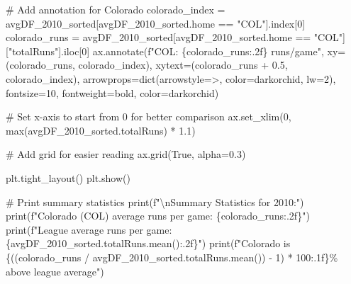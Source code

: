 \documentclass[
  letterpaper,
  DIV=11,
  numbers=noendperiod]{scrartcl}
\newenvironment{Shaded}{\begin{snugshade}}{\end{snugshade}}
\newcommand{\BuiltInTok}[1]{\textcolor[rgb]{0.00,0.23,0.31}{#1}}
\newcommand{\CharTok}[1]{\textcolor[rgb]{0.13,0.47,0.30}{#1}}
\newcommand{\CommentTok}[1]{\textcolor[rgb]{0.37,0.37,0.37}{#1}}
\newcommand{\DecValTok}[1]{\textcolor[rgb]{0.68,0.00,0.00}{#1}}
\newcommand{\FloatTok}[1]{\textcolor[rgb]{0.68,0.00,0.00}{#1}}
\newcommand{\NormalTok}[1]{\textcolor[rgb]{0.00,0.23,0.31}{#1}}
\newcommand{\OperatorTok}[1]{\textcolor[rgb]{0.37,0.37,0.37}{#1}}
\newcommand{\SpecialCharTok}[1]{\textcolor[rgb]{0.37,0.37,0.37}{#1}}
\newcommand{\SpecialStringTok}[1]{\textcolor[rgb]{0.13,0.47,0.30}{#1}}
\newcommand{\StringTok}[1]{\textcolor[rgb]{0.13,0.47,0.30}{#1}}
\newcommand{\VariableTok}[1]{\textcolor[rgb]{0.07,0.07,0.07}{#1}}
\begin{document}
\begin{Shaded}
\begin{Highlighting}[]
\CommentTok{\# Add annotation for Colorado}
\NormalTok{colorado\_index }\OperatorTok{=}\NormalTok{ avgDF\_2010\_sorted[avgDF\_2010\_sorted.home }\OperatorTok{==} \StringTok{"COL"}\NormalTok{].index[}\DecValTok{0}\NormalTok{]}
\NormalTok{colorado\_runs }\OperatorTok{=}\NormalTok{ avgDF\_2010\_sorted[avgDF\_2010\_sorted.home }\OperatorTok{==} \StringTok{"COL"}\NormalTok{][}\StringTok{"totalRuns"}\NormalTok{].iloc[}\DecValTok{0}\NormalTok{]}
\NormalTok{ax.annotate(}\SpecialStringTok{f"COL: }\SpecialCharTok{\{}\NormalTok{colorado\_runs}\SpecialCharTok{:.2f\}}\SpecialStringTok{ runs/game"}\NormalTok{, }
\NormalTok{            xy}\OperatorTok{=}\NormalTok{(colorado\_runs, colorado\_index), }
\NormalTok{            xytext}\OperatorTok{=}\NormalTok{(colorado\_runs }\OperatorTok{+} \FloatTok{0.5}\NormalTok{, colorado\_index),}
\NormalTok{            arrowprops}\OperatorTok{=}\BuiltInTok{dict}\NormalTok{(arrowstyle}\OperatorTok{=}\StringTok{\textquotesingle{}{-}\textgreater{}\textquotesingle{}}\NormalTok{, color}\OperatorTok{=}\StringTok{\textquotesingle{}darkorchid\textquotesingle{}}\NormalTok{, lw}\OperatorTok{=}\DecValTok{2}\NormalTok{),}
\NormalTok{            fontsize}\OperatorTok{=}\DecValTok{10}\NormalTok{, fontweight}\OperatorTok{=}\StringTok{\textquotesingle{}bold\textquotesingle{}}\NormalTok{, color}\OperatorTok{=}\StringTok{\textquotesingle{}darkorchid\textquotesingle{}}\NormalTok{)}

\CommentTok{\# Set x{-}axis to start from 0 for better comparison}
\NormalTok{ax.set\_xlim(}\DecValTok{0}\NormalTok{, }\BuiltInTok{max}\NormalTok{(avgDF\_2010\_sorted.totalRuns) }\OperatorTok{*} \FloatTok{1.1}\NormalTok{)}

\CommentTok{\# Add grid for easier reading}
\NormalTok{ax.grid(}\VariableTok{True}\NormalTok{, alpha}\OperatorTok{=}\FloatTok{0.3}\NormalTok{)}

\NormalTok{plt.tight\_layout()}
\NormalTok{plt.show()}

\CommentTok{\# Print summary statistics}
\BuiltInTok{print}\NormalTok{(}\SpecialStringTok{f"}\CharTok{\textbackslash{}n}\SpecialStringTok{Summary Statistics for 2010:"}\NormalTok{)}
\BuiltInTok{print}\NormalTok{(}\SpecialStringTok{f"Colorado (COL) average runs per game: }\SpecialCharTok{\{}\NormalTok{colorado\_runs}\SpecialCharTok{:.2f\}}\SpecialStringTok{"}\NormalTok{)}
\BuiltInTok{print}\NormalTok{(}\SpecialStringTok{f"League average runs per game: }\SpecialCharTok{\{}\NormalTok{avgDF\_2010\_sorted}\SpecialCharTok{.}\NormalTok{totalRuns}\SpecialCharTok{.}\NormalTok{mean()}\SpecialCharTok{:.2f\}}\SpecialStringTok{"}\NormalTok{)}
\BuiltInTok{print}\NormalTok{(}\SpecialStringTok{f"Colorado is }\SpecialCharTok{\{}\NormalTok{((colorado\_runs }\OperatorTok{/}\NormalTok{ avgDF\_2010\_sorted.totalRuns.mean()) }\OperatorTok{{-}} \DecValTok{1}\NormalTok{) }\OperatorTok{*} \DecValTok{100}\SpecialCharTok{:.1f\}}\SpecialStringTok{\% above league average"}\NormalTok{)}
\end{Highlighting}
\end{Shaded}
\end{document}
